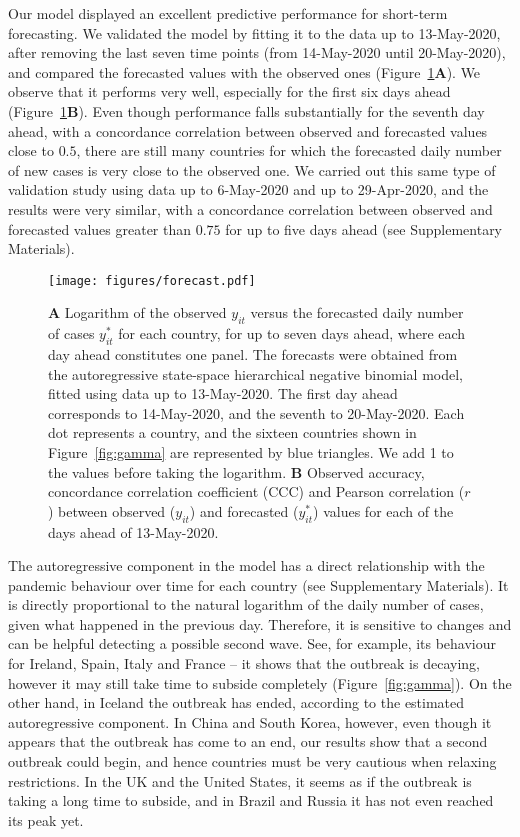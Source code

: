 \documentclass[fleqn,10pt]{wlscirep}
\begin{document}
Our model displayed an excellent predictive performance for short-term forecasting. We validated the model by fitting it to the data up to 13-May-2020, after removing the last seven time points (from 14-May-2020 until 20-May-2020), and compared the forecasted values with the observed ones (Figure~\ref{fig:forecast}\textbf{A}). We observe that it performs very well, especially for the first six days ahead (Figure~\ref{fig:forecast}\textbf{B}). Even though performance falls substantially for the seventh day ahead, with a concordance correlation between observed and forecasted values close to $0.5$, there are still many countries for which the forecasted daily number of new cases is very close to the observed one. We carried out this same type of validation study using data up to 6-May-2020 and up to 29-Apr-2020, and the results were very similar, with a concordance correlation between observed and forecasted values greater than $0.75$ for up to five days ahead (see Supplementary Materials).
\begin{figure}[ht!]
    \centering
    \texttt{[image: figures/forecast.pdf]}
    \caption{\textbf{A} Logarithm of the observed $y_{it}$ versus the forecasted daily number of cases $y^*_{it}$ for each country, for up to seven days ahead, where each day ahead constitutes one panel. The forecasts were obtained from the autoregressive state-space hierarchical negative binomial model, fitted using data up to 13-May-2020. The first day ahead corresponds to 14-May-2020, and the seventh to 20-May-2020. Each dot represents a country, and the sixteen countries shown in Figure~\ref{fig:gamma} are represented by blue triangles. We add 1 to the values before taking the logarithm. \textbf{B} Observed accuracy, concordance correlation coefficient (CCC) and Pearson correlation ($r$) between observed ($y_{it}$) and forecasted ($y^*_{it}$) values for each of the days ahead of 13-May-2020.}
    \label{fig:forecast}
\end{figure}

The autoregressive component in the model has a direct relationship with the pandemic behaviour over time for each country (see Supplementary Materials). It is directly proportional to the natural logarithm of the daily number of cases, given what happened in the previous day. Therefore, it is sensitive to changes and can be helpful detecting a possible second wave. See, for example, its behaviour for Ireland, Spain, Italy and France -- it shows that the outbreak is decaying, however it may still take time to subside completely (Figure~\ref{fig:gamma}). On the other hand, in Iceland the outbreak has ended, according to the estimated autoregressive component. In China and South Korea, however, even though it appears that the outbreak has come to an end, our results show that a second outbreak could begin, and hence countries must be very cautious when relaxing restrictions. In the UK and the United States, it seems as if the outbreak is taking a long time to subside, and in Brazil and Russia it has not even reached its peak yet.
\end{document}
